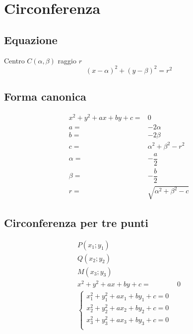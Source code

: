 \chapter{Circonferenza}
\section{Equazione}
Centro $C(\alpha,\beta)$ raggio $r$
\begin{equation}
(x-\alpha)^2+(y-\beta)^2=r^2
\end{equation}
\section{Forma canonica}
\begin{align}
x^2+y^2+ax+by+c=&0\\
a=&-2\alpha\\
b=&-2\beta\\
c=&\alpha^2+\beta^2-r^2\\
\alpha=&-\dfrac{a}{2}\\
\beta=&-\dfrac{b}{2}\\
r=&\sqrt{\alpha^2+\beta^2-c}
\end{align}

\section{Circonferenza per tre punti}
\begin{align}
P(x_1;y_1)&\\
Q(x_2;y_2)&\\
M(x_3;y_3)&\\
x^2+y^2+ax+by+c=&0\\
\begin{cases}
x_1^2+y_1^2+ax_1+by_1+c=0\\
x_2^2+y_2^2+ax_2+by_2+c=0\\
x_3^2+y_3^2+ax_3+by_3+c=0\\
\end{cases}&
\end{align}
